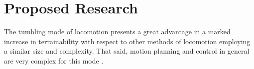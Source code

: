 








\section{Proposed Research}





The tumbling mode of locomotion presents a great advantage in a marked increase
in terrainability with respect to other methods of locomotion employing a
similar size and complexity. That said, motion planning and control in general
are very complex for this mode \cite{Hemes2011}.

